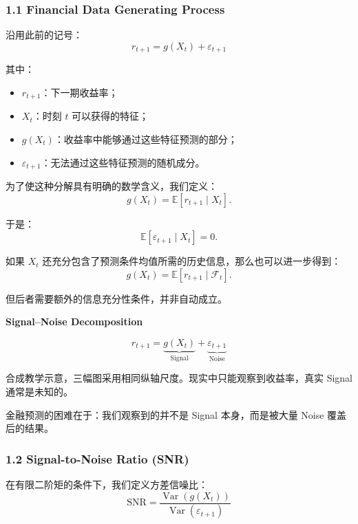 \hypertarget{part-4-60-0001-financial-data-generating-process}{%
\subsubsection{1.1 Financial Data Generating Process}\label{part-4-60-0001-financial-data-generating-process}}

沿用此前的记号：
\[\boxed{
r_{t+1}=g(X_t)+\varepsilon_{t+1}
}\]

其中：

\begin{itemize}
\tightlist
\item
  \(r_{t+1}\)：下一期收益率；
\item
  \(X_t\)：时刻 \(t\) 可以获得的特征；
\item
  \(g(X_t)\)：收益率中能够通过这些特征预测的部分；
\item
  \(\varepsilon_{t+1}\)：无法通过这些特征预测的随机成分。
\end{itemize}

为了使这种分解具有明确的数学含义，我们定义：
\[g(X_t)
=
\mathbb E[r_{t+1}\mid X_t].\]

于是：
\[\boxed{
\mathbb E[\varepsilon_{t+1}\mid X_t]=0.
}\]

如果 \(X_t\) 还充分包含了预测条件均值所需的历史信息，那么也可以进一步得到：
\[g(X_t)=
\mathbb E[r_{t+1}\mid\mathcal F_t].\]

但后者需要额外的信息充分性条件，并非自动成立。

\textbf{Signal--Noise Decomposition}


\[r_{t+1}=\underbrace{g(X_t)}_{\text{Signal}}+\underbrace{\varepsilon_{t+1}}_{\text{Noise}}\]

合成教学示意，三幅图采用相同纵轴尺度。现实中只能观察到收益率，真实 Signal 通常是未知的。

金融预测的困难在于：我们观察到的并不是 Signal 本身，而是被大量 Noise 覆盖后的结果。

\hypertarget{part-4-60-0001-signal-to-noise-ratio-snr}{%
\subsubsection{1.2 Signal-to-Noise Ratio (SNR)}\label{part-4-60-0001-signal-to-noise-ratio-snr}}

在有限二阶矩的条件下，我们定义方差信噪比：
\[\boxed{
\mathrm{SNR}
=
\frac{\operatorname{Var}(g(X_t))}
{\operatorname{Var}(\varepsilon_{t+1})}
}\]

